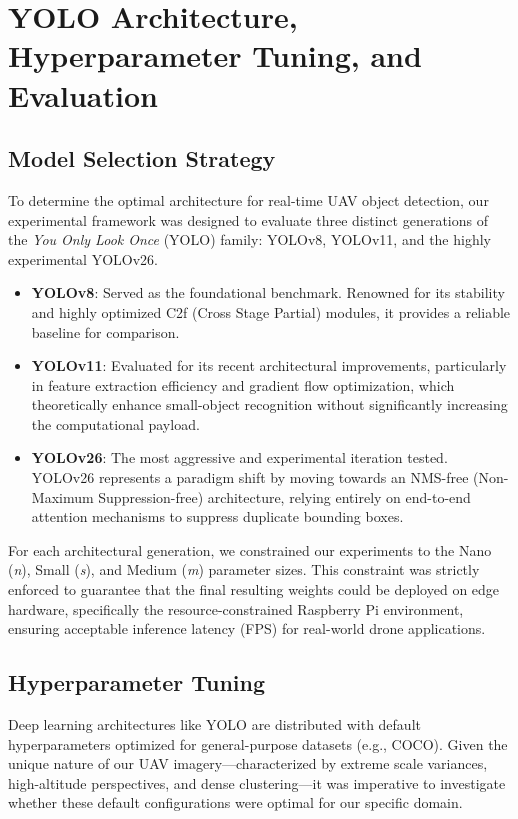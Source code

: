 
\chapter{YOLO Architecture, Hyperparameter Tuning, and Evaluation}
\label{ch:models}

\section{Model Selection Strategy}
To determine the optimal architecture for real-time UAV object detection, our experimental framework was designed to evaluate three distinct generations of the \textit{You Only Look Once} (YOLO) family: YOLOv8, YOLOv11, and the highly experimental YOLOv26. 

\begin{itemize}
    \item \textbf{YOLOv8}: Served as the foundational benchmark. Renowned for its stability and highly optimized C2f (Cross Stage Partial) modules, it provides a reliable baseline for comparison.
    \item \textbf{YOLOv11}: Evaluated for its recent architectural improvements, particularly in feature extraction efficiency and gradient flow optimization, which theoretically enhance small-object recognition without significantly increasing the computational payload.
    \item \textbf{YOLOv26}: The most aggressive and experimental iteration tested. YOLOv26 represents a paradigm shift by moving towards an NMS-free (Non-Maximum Suppression-free) architecture, relying entirely on end-to-end attention mechanisms to suppress duplicate bounding boxes. 
\end{itemize}

For each architectural generation, we constrained our experiments to the Nano (\textit{n}), Small (\textit{s}), and Medium (\textit{m}) parameter sizes. This constraint was strictly enforced to guarantee that the final resulting weights could be deployed on edge hardware, specifically the resource-constrained Raspberry Pi environment, ensuring acceptable inference latency (FPS) for real-world drone applications.

\section{Hyperparameter Tuning}
Deep learning architectures like YOLO are distributed with default hyperparameters optimized for general-purpose datasets (e.g., COCO). Given the unique nature of our UAV imagery—characterized by extreme scale variances, high-altitude perspectives, and dense clustering—it was imperative to investigate whether these default configurations were optimal for our specific domain.

